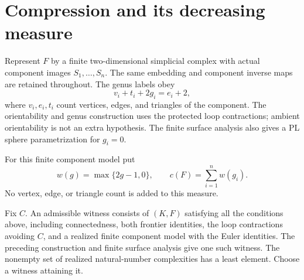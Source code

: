 \section{Compression and its decreasing measure}
\label{sec:compression-minimality}

Represent $F$ by a finite two-dimensional simplicial complex with actual
component images $S_1,\ldots,S_n$. The same embedding and component inverse
maps are retained throughout. The genus labels obey
\[
 v_i+t_i+2g_i=e_i+2,
\]
where $v_i,e_i,t_i$ count vertices, edges, and triangles of the component.
The orientability and genus construction uses the protected loop
contractions; ambient orientability is not an extra hypothesis. The
finite surface analysis also gives a PL sphere parametrization for $g_i=0$.

\begin{definition}
\label{def:compression-complexity}
For this finite component model put
\[
 w(g)=\max\{2g-1,0\},\qquad c(F)=\sum_{i=1}^n w(g_i).
\]
No vertex, edge, or triangle count is added to this measure.
\end{definition}

Fix $C$. An admissible witness consists of $(K,F)$ satisfying all the
conditions above, including connectedness, both frontier identities, the
loop contractions avoiding $C$, and a realized finite component model
with the Euler identities. The preceding construction and finite surface
analysis give one such witness. The nonempty set of realized natural-number
complexities has a least element. Choose a witness attaining it.

